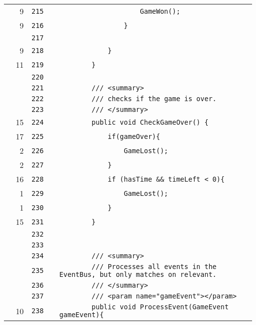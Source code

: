 \documentclass[a4paper,landscape,10pt]{article}
\begin{document}
\begin{longtable}[l]{lrrll}
\cellcolor{green} & 9 & \verb~215~ & & \verb~                    GameWon();~\\
\cellcolor{green} & 9 & \verb~216~ & & \verb~                }~\\
\cellcolor{gray} &  & \verb~217~ & & \verb~~\\
\cellcolor{green} & 9 & \verb~218~ & & \verb~            }~\\
\cellcolor{green} & 11 & \verb~219~ & & \verb~        }~\\
\cellcolor{gray} &  & \verb~220~ & & \verb~~\\
\cellcolor{gray} &  & \verb~221~ & & \verb~        /// <summary>~\\
\cellcolor{gray} &  & \verb~222~ & & \verb~        /// checks if the game is over.~\\
\cellcolor{gray} &  & \verb~223~ & & \verb~        /// </summary>~\\
\cellcolor{green} & 15 & \verb~224~ & & \verb~        public void CheckGameOver() {~\\
\cellcolor{green} & 17 & \verb~225~ & & \verb~            if(gameOver){~\\
\cellcolor{green} & 2 & \verb~226~ & & \verb~                GameLost();~\\
\cellcolor{green} & 2 & \verb~227~ & & \verb~            }~\\
\cellcolor{green} & 16 & \verb~228~ & & \verb~            if (hasTime && timeLeft < 0){~\\
\cellcolor{green} & 1 & \verb~229~ & & \verb~                GameLost();~\\
\cellcolor{green} & 1 & \verb~230~ & & \verb~            }~\\
\cellcolor{green} & 15 & \verb~231~ & & \verb~        }~\\
\cellcolor{gray} &  & \verb~232~ & & \verb~~\\
\cellcolor{gray} &  & \verb~233~ & & \verb~~\\
\cellcolor{gray} &  & \verb~234~ & & \verb~        /// <summary>~\\
\cellcolor{gray} &  & \verb~235~ & & \verb~        /// Processes all events in the EventBus, but only matches on relevant.~\\
\cellcolor{gray} &  & \verb~236~ & & \verb~        /// </summary>~\\
\cellcolor{gray} &  & \verb~237~ & & \verb~        /// <param name="gameEvent"></param>~\\
\cellcolor{green} & 10 & \verb~238~ & & \verb~        public void ProcessEvent(GameEvent gameEvent){~\\

\end{longtable}
\end{document}
